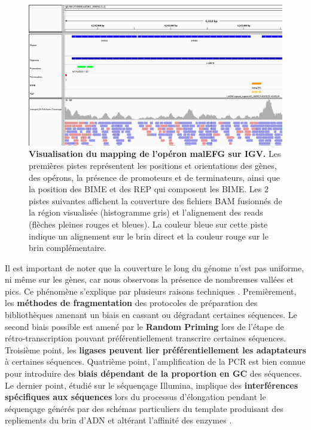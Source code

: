 \documentclass[12pt,a4paper]{report}
\begin{document}
\begin{onehalfspace}
\begin{figure}[ht]
\centerline{\includegraphics[scale=0.4]{figures/igv_snapshot.png}}
\caption{\textbf{Visualisation du mapping de l'opéron malEFG sur IGV.} Les premières pistes représentent les positions et orientations des gènes, des opérons, la présence de promoteurs et de terminateurs, ainsi que la position des BIME et des REP qui composent les BIME. Les 2 pistes suivantes affichent la couverture des fichiers BAM fusionnés de la région visualisée (histogramme gris) et l'alignement des reads (flèches pleines rouges et bleues). La couleur bleue sur cette piste indique un alignement sur le brin direct et la couleur rouge sur le brin complémentaire.}
\label{fig:igv} 
\end{figure}

Il est important de noter que la couverture le long du génome n'est pas uniforme, ni même sur les gènes, car nous observons la présence de nombreuses vallées et pics. Ce phénomène s'explique par plusieurs raisons techniques \citep{Li2013}. Premièrement, les \textbf{méthodes de fragmentation} des protocoles de préparation des bibliothèques amenant un biais en cassant ou dégradant certaines séquences. Le second biais possible est amené par le \textbf{Random Priming} lors de l'étape de rétro-transcription pouvant préférentiellement transcrire certaines séquences. Troisième point, les \textbf{ligases peuvent lier préférentiellement les adaptateurs} à certaines séquences. Quatrième point, l'amplification de la PCR est bien connue pour introduire des \textbf{biais dépendant de la proportion en GC} des séquences. Le dernier point, étudié sur le séquençage Illumina, implique des \textbf{interférences spécifiques aux séquences} lors du processus d'élongation pendant le séquençage générés par des schémas particuliers du template produisant des repliements du brin d'ADN et altérant l'affinité des enzymes \citep{Nakamura2011}.


\end{onehalfspace}
\end{document}

